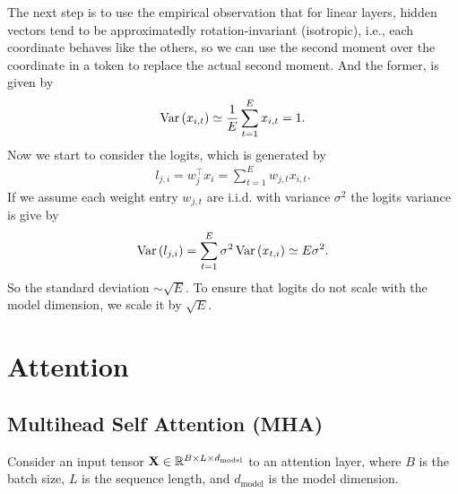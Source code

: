 \documentclass[11pt]{article}  %
\begin{document}
The next step is to use the empirical observation that for linear layers, hidden vectors tend to be approximatedly rotation-invariant (isotropic), i.e., each coordinate behaves like the others, so we can use the second moment over the coordinate in a token to replace the actual second moment.
And the former, is given by 
\begin{align}
  \operatorname{Var}\left( x_{i, t} \right) \simeq \frac{1}{E}\sum_{t=1}^{E}x_{i, t} = 1.
\end{align}
Now we start to consider the logits, which is generated by 
\begin{align*}
  l_{j, i} = w_j^{\top}x_i = \sum_{t=1}^{E}w_{j, t}x_{i, t}.
\end{align*}
If we assume each weight entry $w_{j, t}$ are i.i.d. with variance $\sigma^2$ the logits variance is give by 
\begin{align*}
  \operatorname{Var}\left( l_{j, i} \right) = \sum_{t=1}^{E} \sigma^2 \operatorname{Var} \left( x_{t, i} \right) \simeq E \sigma^2.
\end{align*}
So the standard deviation $\sim \sqrt{E}$.
To ensure that logits do not scale with the model dimension, we scale it by $\sqrt{E}$.



\section{Attention}

\subsection{Multihead Self Attention (MHA)}
Consider an input tensor $\mathbf{X} \in \mathbb{R}^{B \times L \times d_{\text{model}}}$ to an attention layer, where $B$ is the batch size, $L$ is the sequence length, and $d_{\text{model}}$ is the model dimension.
\end{document}
